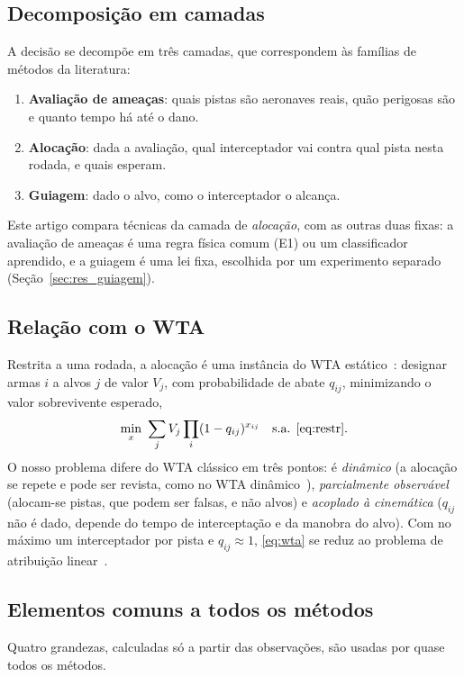 \documentclass[11pt,a4paper]{article}
\begin{document}
\subsection{Decomposição em camadas}
A decisão se decompõe em três camadas, que correspondem às famílias de métodos da literatura:
\begin{enumerate}
  \item \textbf{Avaliação de ameaças}: quais pistas são aeronaves reais, quão perigosas são e quanto tempo há até o dano.
  \item \textbf{Alocação}: dada a avaliação, qual interceptador vai contra qual pista nesta rodada, e quais esperam.
  \item \textbf{Guiagem}: dado o alvo, como o interceptador o alcança.
\end{enumerate}
Este artigo compara técnicas da camada de \emph{alocação}, com as outras duas fixas: a avaliação de ameaças é uma regra
física comum (E1) ou um classificador aprendido, e a guiagem é uma lei fixa, escolhida por um experimento separado
(Seção~\ref{sec:res_guiagem}).

\subsection{Relação com o WTA}
Restrita a uma rodada, a alocação é uma instância do WTA estático~\cite{manne1958}: designar armas $i$ a alvos $j$ de
valor $V_j$, com probabilidade de abate $q_{ij}$, minimizando o valor sobrevivente esperado,
\begin{equation}
  \min_{x}\ \sum_{j} V_j \prod_{i} (1-q_{ij})^{x_{ij}}\quad\text{s.a. \eqref{eq:restr}}.
  \label{eq:wta}
\end{equation}
O nosso problema difere do WTA clássico em três pontos: é \emph{dinâmico} (a alocação se repete e pode ser revista, como
no WTA dinâmico~\cite{hosein1990}), \emph{parcialmente observável} (alocam-se pistas, que podem ser falsas, e não alvos) e
\emph{acoplado à cinemática} ($q_{ij}$ não é dado, depende do tempo de interceptação e da manobra do alvo). Com no máximo
um interceptador por pista e $q_{ij}\approx1$, \eqref{eq:wta} se reduz ao problema de atribuição linear~\cite{kuhn1955}.

\subsection{Elementos comuns a todos os métodos}\label{sec:comuns}
Quatro grandezas, calculadas só a partir das observações, são usadas por quase todos os métodos.
\end{document}
